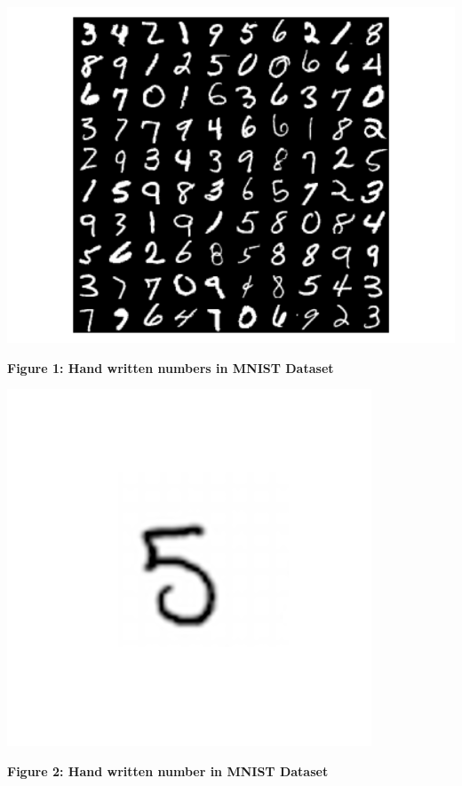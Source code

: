 \begin{center}
\includegraphics[scale=5]{images/mnist-digits-small.png}\label{s:MNIST-digits-small}
\end{center}
\textbf{Figure 1: Hand written numbers in MNIST Dataset
~\cite{hid-sp18-401-MNIST-image}}

\begin{center}
\includegraphics[scale=0.25]{images/mnist-digit-big.png}\label{s:MNIST-digit}
\end{center}
\textbf{Figure 2: Hand written number in MNIST Dataset
~\cite{hid-sp18-401-MNIST-single-digit-image}}





